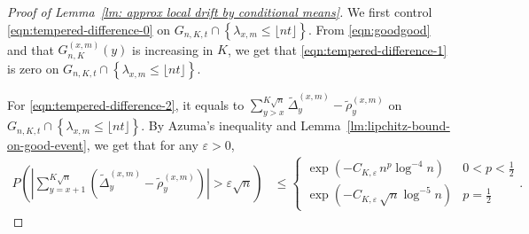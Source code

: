 \documentclass[twoside,12pt, a4paper]{article}
\numberwithin{equation}{section}
\theoremstyle{remark}
\begin{document}
	\begin{proof}[Proof of Lemma~\ref{lm: approx local drift by conditional means}]
		We first control \eqref{eqn:tempered-difference-0} on $G_{n, K, t} \cap \left\{\lambda_{x,m} \leq\lfloor nt \rfloor \right\}$. From \eqref{eqn:goodgood} and that $G_{n,K}^{(x,m)}(y)$ is increasing in $K$, we get that  \eqref{eqn:tempered-difference-1} is zero on $G_{n, K, t} \cap \left\{\lambda_{x,m} \leq\lfloor nt \rfloor \right\}$. 
		
		For \eqref{eqn:tempered-difference-2}, it equals to
		$
		 \sum_{y > x}^{K\sqrt{n}} \tilde \Delta_{y}^{(x,m)} - \tilde\rho_y^{(x,m)}
		$
		 on $G_{n, K, t} \cap \left\{\lambda_{x,m} \leq\lfloor nt \rfloor \right\}$. By Azuma's inequality and Lemma~\ref{lm:lipchitz-bound-on-good-event}, we get that for any $\varepsilon>0$,
		\begin{align}
			P\left( \left| \sum_{y = x + 1}^{K \sqrt{n} } (\tilde\Delta_y^{(x,m)} - \tilde\rho_y^{(x,m)}) \right| > \varepsilon \sqrt{n}  \right) 
			&
			\label{eqn:azuma-drift-martingale}
			\le \begin{cases}
				\exp\left( - C_{K, \varepsilon} \, n^{p } \log^{-4} n \right)
				& 0 < p < \frac{1}{2} \\
				\exp\left( - C_{K, \varepsilon} \, \sqrt{n}  \log^{-5} n \right)
				& p = \frac{1}{2}
			\end{cases}
			.\end{align}
		

\end{proof}
\end{document}

